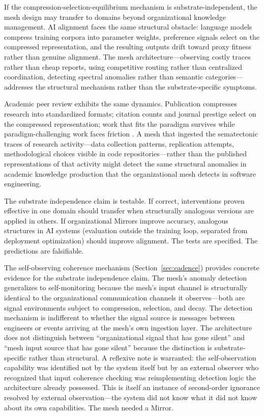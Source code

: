 \documentclass[11pt,a4paper]{article}
\begin{document}
If the compression-selection-equilibrium mechanism is substrate-independent, the mesh design may transfer to domains beyond organizational knowledge management. AI alignment faces the same structural obstacle: language models compress training corpora into parameter weights, preference signals select on the compressed representation, and the resulting outputs drift toward proxy fitness rather than genuine alignment. The mesh architecture---observing costly traces rather than cheap reports, using competitive routing rather than centralized coordination, detecting spectral anomalies rather than semantic categories---addresses the structural mechanism rather than the substrate-specific symptoms.

Academic peer review exhibits the same dynamics. Publication compresses research into standardized formats; citation counts and journal prestige select on the compressed representation; work that fits the paradigm survives while paradigm-challenging work faces friction \citep{smaldino2016}. A mesh that ingested the sematectonic traces of research activity---data collection patterns, replication attempts, methodological choices visible in code repositories---rather than the published representations of that activity might detect the same structural anomalies in academic knowledge production that the organizational mesh detects in software engineering.

The substrate independence claim is testable. If correct, interventions proven effective in one domain should transfer when structurally analogous versions are applied in others. If organizational Mirrors improve accuracy, analogous structures in AI systems (evaluation outside the training loop, separated from deployment optimization) should improve alignment. The tests are specified. The predictions are falsifiable.

The self-observing coherence mechanism (Section~\ref{sec:cadence}) provides concrete evidence for the substrate independence claim. The mesh's anomaly detection generalizes to self-monitoring because the mesh's input channel is structurally identical to the organizational communication channels it observes---both are signal environments subject to compression, selection, and decay. The detection mechanism is indifferent to whether the signal source is messages between engineers or events arriving at the mesh's own ingestion layer. The architecture does not distinguish between ``organizational signal that has gone silent'' and ``mesh input source that has gone silent'' because the distinction is substrate-specific rather than structural. A reflexive note is warranted: the self-observation capability was identified not by the system itself but by an external observer who recognized that input coherence checking was reimplementing detection logic the architecture already possessed. This is itself an instance of second-order ignorance resolved by external observation---the system did not know what it did not know about its own capabilities. The mesh needed a Mirror.
\end{document}
